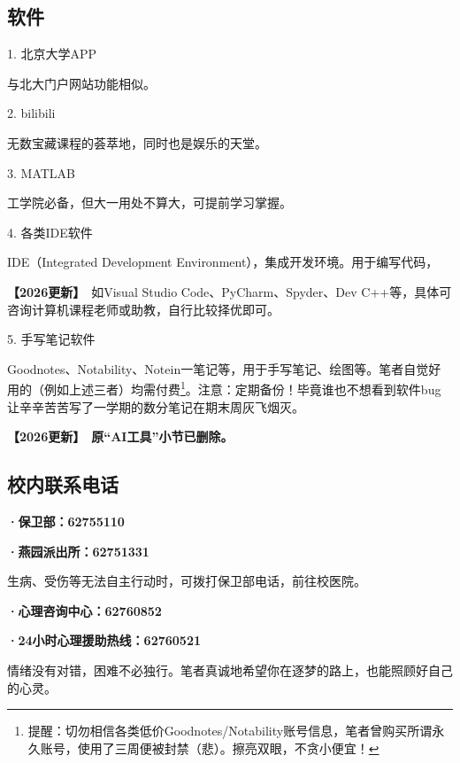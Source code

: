 \documentclass[11pt,oneside]{book}
\newcommand{\updateMark}{\textcolor{chaph}{\textbf{【2026更新】}}\ }
\begin{document}
\subsection{软件}

1. 北京大学APP

与北大门户网站功能相似。

\vspace{10pt}

2. bilibili

无数宝藏课程的荟萃地，同时也是娱乐的天堂。

\vspace{10pt}

3. MATLAB

工学院必备，但大一用处不算大，可提前学习掌握。

\vspace{10pt}

4. 各类IDE软件

IDE（Integrated Development Environment），集成开发环境。用于编写代码，

\updateMark 如Visual Studio Code、PyCharm、Spyder、Dev C++等，具体可咨询计算机课程老师或助教，自行比较择优即可。

\vspace{10pt}

5. 手写笔记软件

Goodnotes、Notability、Notein一笔记等，用于手写笔记、绘图等。笔者自觉好用的（例如上述三者）均需付费\footnote{提醒：切勿相信各类低价Goodnotes/Notability账号信息，笔者曾购买所谓永久账号，使用了三周便被封禁（悲）。擦亮双眼，不贪小便宜！}。注意：定期备份！毕竟谁也不想看到软件bug让辛辛苦苦写了一学期的数分笔记在期末周灰飞烟灭。

\updateMark\textbf{原“AI工具”小节已删除。}

\subsection{校内联系电话}

\textbf{·保卫部：62755110}

\textbf{·燕园派出所：62751331}

生病、受伤等无法自主行动时，可拨打保卫部电话，前往校医院。

\vspace{10pt}

\textbf{·心理咨询中心：62760852}

\textbf{·24小时心理援助热线：62760521}

情绪没有对错，困难不必独行。笔者真诚地希望你在逐梦的路上，也能照顾好自己的心灵。
\end{document}
